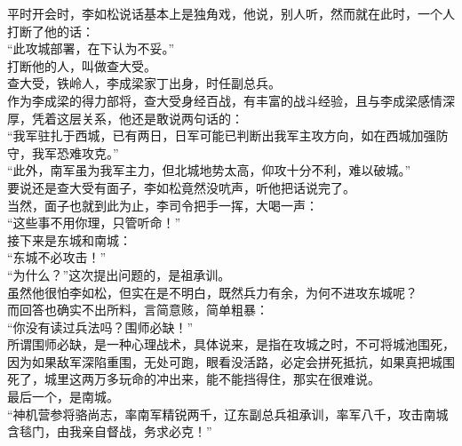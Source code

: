\begin{multicols}{\theparacolNo}
平时开会时，李如松说话基本上是独角戏，他说，别人听，然而就在此时，一个人打断了他的话：\\

“此攻城部署，在下认为不妥。”\\

打断他的人，叫做查大受。\\

查大受，铁岭人，李成梁家丁出身，时任副总兵。\\

作为李成梁的得力部将，查大受身经百战，有丰富的战斗经验，且与李成梁感情深厚，凭着这层关系，他还是敢说两句话的：\\

“我军驻扎于西城，已有两日，日军可能已判断出我军主攻方向，如在西城加强防守，我军恐难攻克。”\\

“此外，南军虽为我军主力，但北城地势太高，仰攻十分不利，难以破城。”\\

要说还是查大受有面子，李如松竟然没吭声，听他把话说完了。\\

当然，面子也就到此为止，李司令把手一挥，大喝一声：\\

“这些事不用你理，只管听命！”\\

接下来是东城和南城：\\

“东城不必攻击！”\\

“为什么？”这次提出问题的，是祖承训。\\

虽然他很怕李如松，但实在是不明白，既然兵力有余，为何不进攻东城呢？\\

而回答也确实不出所料，言简意赅，简单粗暴：\\

“你没有读过兵法吗？围师必缺！”\\

所谓围师必缺，是一种心理战术，具体说来，是指在攻城之时，不可将城池围死，因为如果敌军深陷重围，无处可跑，眼看没活路，必定会拼死抵抗，如果真把城围死了，城里这两万多玩命的冲出来，能不能挡得住，那实在很难说。\\

最后一个，是南城。\\

“神机营参将骆尚志，率南军精锐两千，辽东副总兵祖承训，率军八千，攻击南城含毯门，由我亲自督战，务求必克！”\\


\end{multicols}
